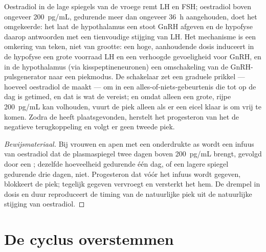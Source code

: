 \begin{theorem}\label{thm:b2:reproductive-hormones:switch}
Oestradiol in de lage spiegels van de vroege  remt LH en
FSH; oestradiol boven ongeveer \qty{200}{pg/mL}, gedurende meer dan
ongeveer \qty{36}{h} aangehouden, doet het omgekeerde: het laat de
hypothalamus een stoot GnRH afgeven en de hypofyse daarop antwoorden met
een tienvoudige stijging van LH. Het mechanisme is een omkering van teken,
niet van grootte: een hoge, aanhoudende dosis induceert in de hypofyse een
grote voorraad LH en een verhoogde gevoeligheid voor GnRH, en in de
hypothalamus (via kisspeptineneuronen) een omschakeling van de
GnRH-pulsgenerator naar een piekmodus. De schakelaar zet een graduele
prikkel --- hoeveel oestradiol de  maakt --- om in een
alles-of-niets-gebeurtenis die tot op de dag is getimed, en dat is wat de
 vereist; en omdat alleen een grote, rijpe 
\qty{200}{pg/mL} kan volhouden, vuurt de piek alleen als er een eicel klaar
is om vrij te komen. Zodra de  heeft plaatsgevonden, herstelt het
progesteron van het  de negatieve terugkoppeling en volgt er
geen tweede piek.
\end{theorem}
\begin{proof}[Bewijsmateriaal]
Bij vrouwen en apen met een onderdrukte as wordt een infuus van oestradiol
dat de plasmaspiegel twee dagen boven \qty{200}{pg/mL} brengt, gevolgd door
een ; dezelfde hoeveelheid gedurende één dag, of een lagere spiegel
gedurende drie dagen, niet. Progesteron dat vóór het infuus wordt
gegeven, blokkeert de piek; tegelijk gegeven vervroegt en versterkt het
hem. De drempel in dosis en duur reproduceert de timing van de natuurlijke
piek uit de natuurlijke stijging van oestradiol.
\end{proof}

\section{De cyclus overstemmen}

